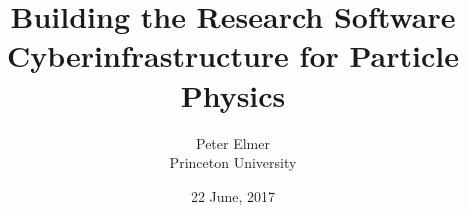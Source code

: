 \documentclass{beamer}
\title{Building the Research Software Cyberinfrastructure for Particle Physics}
\author{Peter Elmer \\ Princeton University}
\date{22 June, 2017}
\begin{document}
%

\begin{frame}
  \titlepage
\end{frame}

%




%







































%





\end{document}
